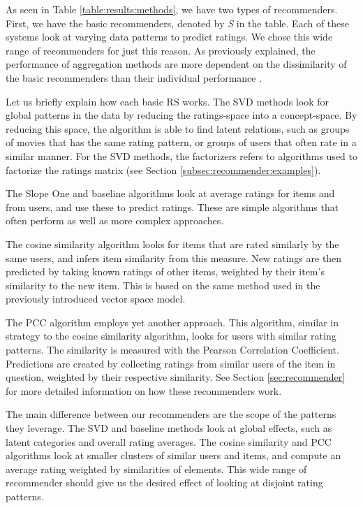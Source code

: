 As seen in Table \ref{table:results:methods}, we have two types of recommenders.
First, we have the basic recommenders, denoted by \emph{S} in the table.
Each of these systems look at varying data patterns to predict ratings.
We chose this wide range of recommenders for just this reason.
As previously explained, the performance of aggregation methods
are more dependent on the dissimilarity of the basic recommenders
than their individual performance \cite[p.6]{Bell2007}.

Let us briefly explain how each basic RS works.
The SVD methods look for global patterns in the data 
by reducing the ratings-space into a concept-space.
By reducing this space, the algorithm is able to find
latent relations, such as groups of movies that has the same
rating pattern, or groups of users that often rate in a similar manner.
For the SVD methods, the factorizers refers to algorithms used to factorize the ratings matrix
(see Section \ref{subsec:recommender:examples}).

The Slope One and baseline algorithms look at average
ratings for items and from users, and use these to predict ratings.
These are simple algorithms that often perform as well
as more complex approaches.

The cosine similarity algorithm looks for items that are rated
similarly by the same users, and infers item similarity from this measure.
New ratings are then predicted by taking known ratings of other items,
weighted by their item's similarity to the new item.
This is based on the same method used in the previously introduced vector space model.

The PCC algorithm employs yet another approach. This algorithm,
similar in strategy to the cosine similarity algorithm,
looks for users with similar rating patterns.
The similarity is measured with the Pearson Correlation Coefficient.
Predictions are created by collecting ratings from similar users
of the item in question, weighted by their respective similarity.
See Section \ref{sec:recommender} for more 
detailed information on how these recommenders work. 

The main difference between our recommenders are the scope of the patterns they leverage.
The SVD and baseline methods look at global effects, such as latent categories
and overall rating averages.
The cosine similarity and PCC algorithms look at smaller clusters of similar
users and items, and compute an average rating weighted by 
similarities of elements.
This wide range of recommender should give us the desired
effect of looking at disjoint rating patterns.


